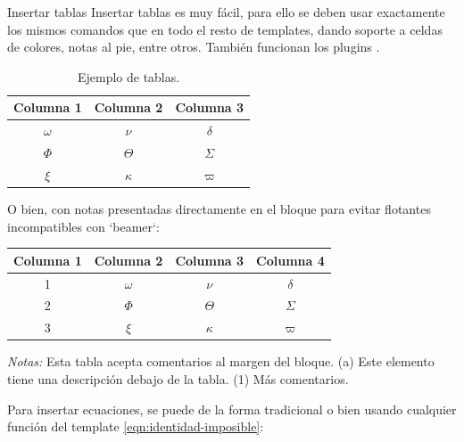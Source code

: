 \begin{block}{Insertar tablas}
	Insertar tablas es muy fácil, para ello se deben usar exactamente los mismos comandos que en todo el resto de templates, dando soporte a celdas de colores, notas al pie, entre otros. También funcionan los plugins \cite{tablesgenerator, excel2latex}.
	
	\begin{table}[H]
		\centering
		\caption{Ejemplo de tablas.}
		\begin{tabular}{ccc}
			\hline
			\textbf{Columna 1} & \textbf{Columna 2} & \textbf{Columna 3} \bigstrut\\
			\hline
			$\omega$ & $\nu$ & $\delta$ \bigstrut[t]\\
			$\Phi$ & $\Theta$ & $\varSigma$ \\
			$\xi$ & $\kappa$ & $\varpi$ \bigstrut[b] \\
			\hline
		\end{tabular}
		\label{tab:tabla-1}
	\end{table}

	O bien, con notas presentadas directamente en el bloque para evitar flotantes incompatibles con `beamer`:
	
	\begin{center}
		\begin{tabular}{cccc}
			\hline
			\textbf{Columna 1} & \textbf{Columna 2} & \textbf{Columna 3} & \textbf{Columna 4} \bigstrut\\
			\hline
			1 & $\omega$ & $\nu$ & $\delta$ \\
			2 & $\Phi$ & $\Theta$ & $\varSigma$ \\
			3 & $\xi$ & $\kappa$ & $\varpi$ \\
			\hline
		\end{tabular}
	\end{center}
	
	{\footnotesize\textit{Notas:} Esta tabla acepta comentarios al margen del bloque. (a) Este elemento tiene una descripción debajo de la tabla. (1) Más comentarios.}

	Para insertar ecuaciones, se puede de la forma tradicional o bien usando cualquier función del template \ref{eqn:identidad-imposible}:
	
\end{block}


